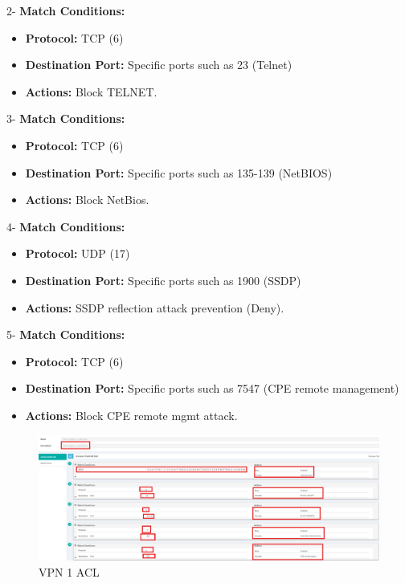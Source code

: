 \documentclass[12pt,english]{report}
\begin{document}
    
2- \textbf{Match Conditions:}
    
\begin{itemize}
    \item \textbf{Protocol:} TCP (6)
    \item \textbf{Destination Port:} Specific ports such as 23 (Telnet)
    \item \textbf{Actions:} Block TELNET.
\end{itemize}
    
3- \textbf{Match Conditions:}
         
\begin{itemize}
    \item \textbf{Protocol:} TCP (6)
    \item \textbf{Destination Port:} Specific ports such as 135-139 (NetBIOS)
    \item \textbf{Actions:} Block NetBios.
\end{itemize}
       
4- \textbf{Match Conditions:}
        
\begin{itemize}
    \item \textbf{Protocol:} UDP (17)
    \item \textbf{Destination Port:} Specific ports such as 1900 (SSDP)
    \item \textbf{Actions:} SSDP reflection attack prevention (Deny).
\end{itemize}
    
5- \textbf{Match Conditions:}
       
\begin{itemize}
    \item \textbf{Protocol:} TCP (6)
    \item \textbf{Destination Port:} Specific ports such as 7547 (CPE remote management)
    \item \textbf{Actions:} Block CPE remote mgmt attack.
\end{itemize}
    
\begin{figure}[H]
    \centering
    \includegraphics[width=1.1\textwidth]{chapitre 3/vpn1_aclg.png}
    \caption{VPN 1 ACL}
    \label{VPN 1 Unified ACL}
\end{figure}
\end{document}
